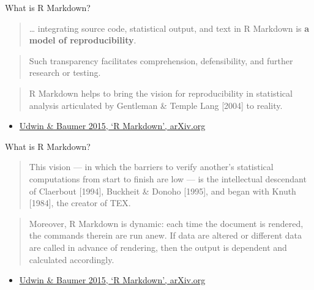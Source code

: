 \documentclass[ignorenonframetext,]{beamer}
\begin{document}
\begin{frame}{What is R Markdown?}

\begin{quote}
\ldots{} integrating source code, statistical output, and text in R
Markdown is \textbf{a model of reproducibility}.
\end{quote}

\begin{quote}
Such transparency facilitates comprehension, defensibility, and further
research or testing.
\end{quote}

\begin{quote}
R Markdown helps to bring the vision for reproducibility in statistical
analysis articulated by Gentleman \& Temple Lang {[}2004{]} to reality.
\end{quote}

\begin{itemize}[<+->]
\itemsep1pt\parskip0pt
\item
  \href{http://arxiv.org/abs/1501.01613}{Udwin \& Baumer 2015, `R
  Markdown', arXiv.org}
\end{itemize}

\end{frame}

\begin{frame}{What is R Markdown?}

\begin{quote}
This vision --- in which the barriers to verify another's statistical
computations from start to finish are low --- is the intellectual
descendant of Claerbout {[}1994{]}, Buckheit \& Donoho {[}1995{]}, and
began with Knuth {[}1984{]}, the creator of TEX.
\end{quote}

\begin{quote}
Moreover, R Markdown is dynamic: each time the document is rendered, the
commands therein are run anew. If data are altered or different data are
called in advance of rendering, then the output is dependent and
calculated accordingly.
\end{quote}

\begin{itemize}[<+->]
\itemsep1pt\parskip0pt
\item
  \href{http://arxiv.org/abs/1501.01613}{Udwin \& Baumer 2015, `R
  Markdown', arXiv.org}
\end{itemize}

\end{frame}
\end{document}
